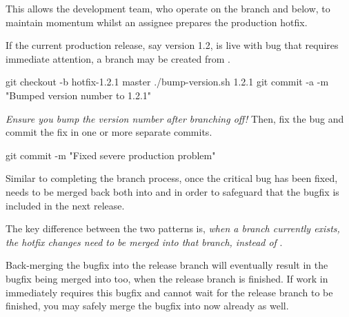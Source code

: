 This allows the development team, who operate on the  branch and below, to maintain momentum whilst an assignee prepares the production hotfix. \newline

If the current production release, say version 1.2, is live with bug that requires immediate attention, a  branch may be created from .

\begin{git-bash}
    git checkout -b hotfix-1.2.1 master
    ./bump-version.sh 1.2.1
    git commit -a -m "Bumped version number to 1.2.1"
\end{git-bash}

\emph{Ensure you bump the version number after branching off!} Then, fix the bug and commit the fix in one or more separate commits.

\begin{git-bash}
    git commit -m "Fixed severe production problem"
\end{git-bash}

Similar to completing the  branch process, once the critical bug has been fixed,  needs to be merged back both into  and  in order to safeguard that the bugfix is included in the next release.

The key difference between the two patterns is, \emph{when a  branch currently exists, the hotfix changes need to be merged into that  branch, instead of }.

Back-merging the bugfix into the release branch will eventually result in the bugfix being merged into  too, when the release branch is finished. If work in  immediately requires this bugfix and cannot wait for the release branch to be finished, you may safely merge the bugfix into  now already as well.

